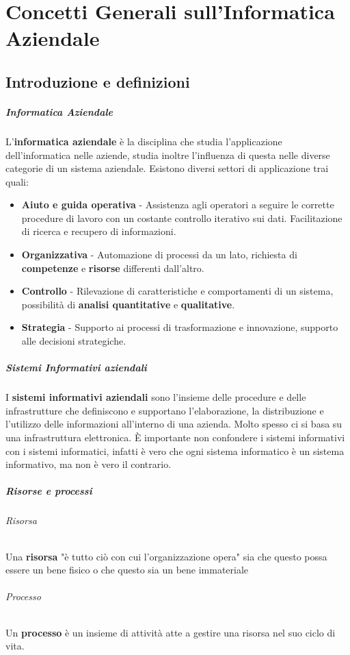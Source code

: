 \chapter{Concetti Generali sull'Informatica Aziendale}
\thispagestyle{chapterInit}
\section{Introduzione e definizioni}
    \paragraph{Informatica Aziendale} L'\textbf{informatica aziendale} è la disciplina che studia l'applicazione dell'informatica nelle aziende, studia inoltre l'influenza di questa nelle diverse categorie di un sistema aziendale. Esistono diversi settori di applicazione trai quali:
        \begin{itemize}
            \item \textbf{Aiuto e guida operativa} - Assistenza agli operatori a seguire le corrette procedure di lavoro con un costante controllo iterativo sui dati. Facilitazione di ricerca e recupero di informazioni.
            \item \textbf{Organizzativa} - Automazione di processi da un lato, richiesta di \textbf{competenze} e \textbf{risorse} differenti dall'altro.
            \item \textbf{Controllo} - Rilevazione di caratteristiche e comportamenti di un sistema, possibilità di \textbf{analisi quantitative} e \textbf{qualitative}.
            \item \textbf{Strategia} - Supporto ai processi di trasformazione e innovazione, supporto alle decisioni strategiche. 
        \end{itemize}
    \paragraph{Sistemi Informativi aziendali} I \textbf{sistemi informativi aziendali} sono l'insieme delle procedure e delle infrastrutture che definiscono e supportano l'elaborazione, la distribuzione e l'utilizzo delle informazioni all'interno di una azienda. Molto spesso ci si basa su una infrastruttura elettronica. È importante non confondere i sistemi informativi con i sistemi informatici, infatti è vero che ogni sistema informatico è un sistema informativo, ma non è vero il contrario.
    \paragraph{Risorse e processi}
        \subparagraph{Risorsa } Una \textbf{risorsa} "è tutto ciò con cui l'organizzazione opera" sia che questo possa essere un bene fisico o che questo sia un bene immateriale
        \subparagraph{Processo } Un \textbf{processo} è un insieme di attività atte a gestire una risorsa nel suo ciclo di vita.

